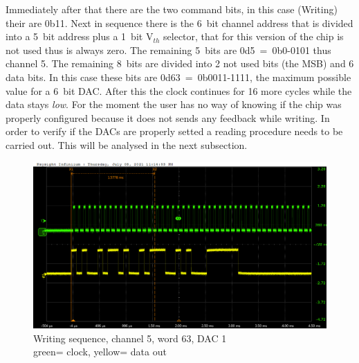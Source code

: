 Immediately after that there are the two command bits, in this case (Writing) their are 0b11.
Next in sequence there is the 6~bit channel address that is divided into a 5~bit address plus a 1~bit V$_{th}$ selector, that for this version of the chip is not used thus is always zero.
The remaining 5~bits are 0d5~=~0b0-0101 thus channel 5. The remaining 8~bits are divided into 2 not used bits (the MSB) and 6 data bits.
In this case these bits are 0d63~=~0b0011-1111, the maximum possible value for a 6~bit DAC.
After this the clock continues for 16 more cycles while the data stays \textit{low}.
For the moment the user has no way of knowing if the chip was properly configured because it does not sends any feedback while writing. In order to verify if the DACs are properly setted a reading procedure needs to be carried out. This will be analysed in the next subsection.  
\begin{figure}[H]
	\centering
	\includegraphics[width=0.7\linewidth]{IMG/ch5/probe/09-08-2021_ch05-write63-baselinedac1}
	\caption{Writing sequence, channel 5, word 63, DAC 1\\{\color{green}green}= clock, {\color{yellow}yellow}= data out}
	\label{fig:ch05write63}
\end{figure}
